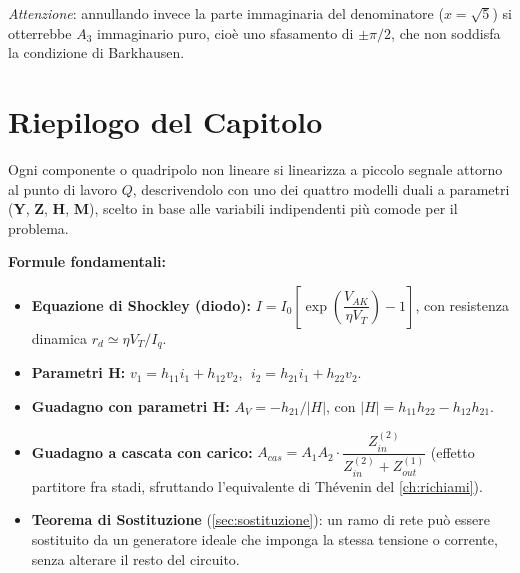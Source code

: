 \noindent\textit{Attenzione}: annullando invece la parte immaginaria del denominatore ($x = \sqrt5$) si otterrebbe $A_3$ immaginario puro, cioè uno sfasamento di $\pm\pi/2$, che non soddisfa la condizione di Barkhausen.

\section*{Riepilogo del Capitolo}

\begin{important}
Ogni componente o quadripolo non lineare si linearizza a piccolo segnale attorno al punto di lavoro $Q$, descrivendolo con uno dei quattro modelli duali a parametri (\textbf{Y}, \textbf{Z}, \textbf{H}, \textbf{M}), scelto in base alle variabili indipendenti più comode per il problema.
\end{important}

\begin{note}
\textbf{Formule fondamentali:}
\begin{itemize}
    \item \textbf{Equazione di Shockley (diodo):} $I = I_0\left[\exp\!\left(\dfrac{V_{AK}}{\eta V_T}\right)-1\right]$, con resistenza dinamica $r_d \simeq \eta V_T / I_q$.
    \item \textbf{Parametri H:} $v_1 = h_{11} i_1 + h_{12} v_2$, $\; i_2 = h_{21} i_1 + h_{22} v_2$.
    \item \textbf{Guadagno con parametri H:} $A_V = -h_{21}/|H|$, con $|H| = h_{11}h_{22} - h_{12}h_{21}$.
    \item \textbf{Guadagno a cascata con carico:} $A_{cas} = A_1 A_2 \cdot \dfrac{Z_{in}^{(2)}}{Z_{in}^{(2)} + Z_{out}^{(1)}}$ (effetto partitore fra stadi, sfruttando l'equivalente di Thévenin del \cref{ch:richiami}).
    \item \textbf{Teorema di Sostituzione} (\cref{sec:sostituzione}): un ramo di rete può essere sostituito da un generatore ideale che imponga la stessa tensione o corrente, senza alterare il resto del circuito.
\end{itemize}
\end{note}


